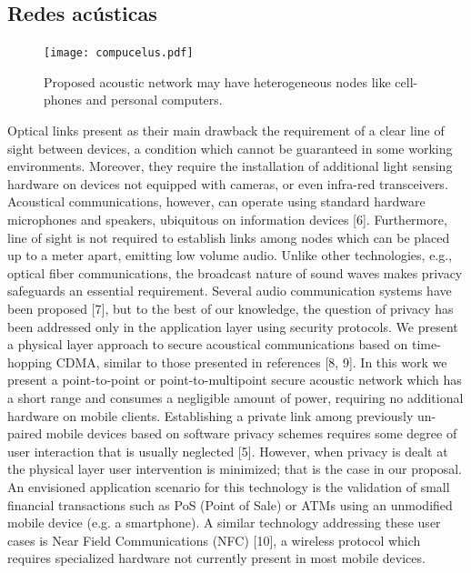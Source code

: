 \subsection{Redes acústicas}
\begin{figure}[!t]
  \centering
    \texttt{[image: compucelus.pdf]}
    \caption{Proposed acoustic network may have heterogeneous nodes like cell-phones and personal computers.}
    \label{arch:chain}
\end{figure}


Optical links present as their main drawback the requirement of a clear line of sight between devices, a condition which cannot be guaranteed in some working environments. Moreover, they require the installation of additional light sensing hardware on devices not equipped with cameras, or even infra-red transceivers.
Acoustical communications, however, can operate using standard hardware microphones and speakers, ubiquitous on information devices [6]. Furthermore, line of sight is not required to establish links among nodes which can be placed up to a meter apart, emitting low volume audio.
Unlike other technologies, e.g., optical fiber communications, the broadcast nature of sound waves makes privacy safeguards an essential requirement. Several audio communication systems have been proposed [7], but to the best of our knowledge, the question of privacy has been addressed only in the application layer using security protocols. We present a physical layer approach to secure acoustical communications based on time-hopping CDMA, similar to those presented in references [8, 9]. In this work we present a point-to-point or point-to-multipoint secure acoustic network which has a short range and consumes a negligible amount of power, requiring no additional hardware on mobile clients.
Establishing a private link among previously un-paired mobile devices based on software privacy schemes requires some degree of user interaction that is usually neglected [5]. However, when privacy is dealt at the physical layer user intervention is minimized; that is the case in our proposal.
An envisioned application scenario for this technology is the validation of small financial transactions such as PoS (Point of Sale) or ATMs using an unmodified mobile device (e.g. a smartphone). A similar technology addressing these user cases is Near Field Communications (NFC) [10], a wireless protocol which requires specialized hardware not currently present in most mobile devices.

